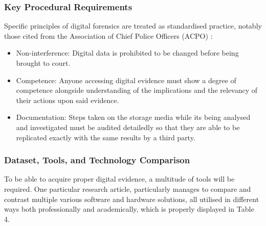\documentclass[12pt,a4paper]{article}
\begin{document}
\subsubsection{Key Procedural Requirements}
Specific principles of digital forensics are treated as standardised practice, notably those cited from the Association of Chief Police Officers (ACPO) \cite{ilyas2024role} :
\begin{itemize}
\item Non-interference: Digital data is prohibited to be changed before being brought to court.
\item Competence: Anyone accessing digital evidence must show a degree of competence alongside understanding of the implications and the relevancy of their actions upon said evidence.
\item Documentation: Steps taken on the storage media while its being analysed and investigated must be audited detailedly so that they are able to be replicated exactly with the same results by a third party.

\end{itemize}
\subsubsection{Dataset, Tools, and Technology Comparison}
To be able to acquire proper digital evidence, a multitude of tools will be required. One particular research article, particularly \cite{hassan2025} manages to compare and contrast multiple various software and hardware solutions, all utilised in different ways both professionally and academically, which is properly displayed in Table 4.
\end{document}
